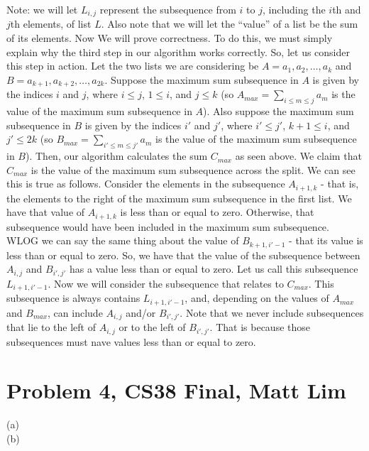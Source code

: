 \documentclass{article}
\begin{document}
Note: we will let $L_{i,j}$ represent the subsequence from $i$ to $j$, including
the $i$th and $j$th elements, of list $L$. Also note that we will let the
``value'' of a list be the sum of its elements.
Now We will prove correctness. To do this, we must simply explain why the third
step in our algorithm works correctly. So, let us consider this step in action.
Let the two lists we are considering be $A = a_1, a_2,
\dots, a_k$ and $B = a_{k+1}, a_{k+2}, \dots, a_{2k}$. Suppose the
maximum sum subsequence in $A$ is given by the indices $i$ and $j$,
where $i \leq j$, $1 \leq i$, and $j \leq k$ (so $A_{max} = \sum_{i \leq m \leq j}
a_m$ is the value of the maximum sum subsequence in $A$). Also suppose the
maximum sum subsequence in $B$ is given by the indices $i'$ and $j'$,
where $i' \leq j'$, $k+1 \leq i$, and $j' \leq 2k$ (so $B_{max} =
\sum_{i' \leq m \leq j'} a_m$ is the value of the maximum sum subsequence in $B$).
Then, our algorithm calculates the sum $C_{max}$ as seen above. We
claim that $C_{max}$ is the value of the maximum sum subsequence across the
split. We can see this is true as follows. Consider the elements in the
subsequence $A_{i+1,k}$ - that is, the elements to the right of the maximum sum
subsequence in the first list. We have that value of $A_{i+1,k}$ is less than or
equal to zero. Otherwise, that subsequence would have been included in the
maximum sum subsequence. WLOG we can say the same thing about the value of
$B_{k+1, i'-1}$ - that its value is less than or equal to zero. So, we have that
the value of the subsequence between $A_{i,j}$ and $B_{i',j'}$
has a value less than or equal to zero. Let us call this subsequence $L_{i+1,
i'-1}$. Now we will consider the subsequence that relates to $C_{max}$. This
subsequence is always contains $L_{i+1,i'-1}$, and, depending on the values of
$A_{max}$ and $B_{max}$, can include $A_{i,j}$ and/or $B_{i',j'}$. Note that we
never include subsequences that lie to the left of $A_{i,j}$ or to the left of
$B_{i',j'}$. That is because those subsequences must nave values less than or
equal to zero.
\newpage

\section*{Problem 4, CS38 Final, Matt Lim}
\begin{description}
    \item[(a)]
    \item[(b)]
\end{description}
\newpage

\end{document}
